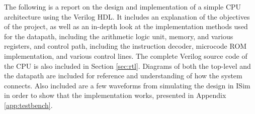 The following is a report on the design and implementation of a simple CPU architecture using the Verilog HDL. It includes an explanation of the objectives of the project, as well as an in-depth look at the implementation methods used for the datapath, including the arithmetic logic unit, memory, and various registers, and control path, including the instruction decoder, microcode ROM implementation, and various control lines. The complete Verilog source code of the CPU is also included in Section \ref{sec:rtl}. Diagrams of both the top-level and the datapath are included for reference and understanding of how the system connects. Also included are a few waveforms from simulating the design in ISim in order to show that the implementation works, presented in Appendix \ref{app:testbench}.